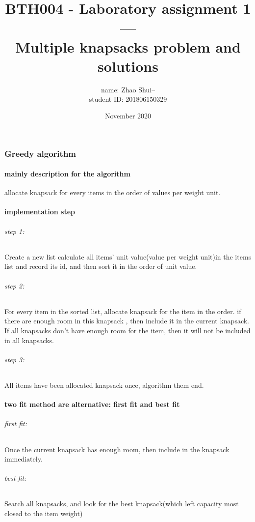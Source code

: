 \documentclass{article}
\title{BTH004 - Laboratory assignment 1---\\
Multiple knapsacks problem and solutions}
\author{name: Zhao Shui--\\student ID: 201806150329}
\date{November 2020}
\begin{document}
\maketitle

\part{}
\section{Greedy algorithm}
\subsection{mainly description for the algorithm}
allocate knapsack for every items in the order of values per weight unit.
\subsection{implementation step}
\paragraph{step 1:} Create a new list calculate all items’ unit value(value per weight unit)in the items list and record its id, and then sort it in the order of unit value.
\paragraph{step 2:} For every item in the sorted list, allocate knapsack for the item in the order. if there are enough room in this knapsack , then include it in the current knapsack. If all knapsacks don’t have enough room for the item, then it will not be included in all knapsacks.
\paragraph{step 3:} All items have been allocated knapsack once, algorithm them end.
\subsection{two fit method are alternative: first fit and best fit}
\paragraph{first fit:}Once the current knapsack has enough room, then include in the knapsack immediately.
\paragraph{best fit:}Search all knapsacks, and look for the best knapsack(which left capacity most closed to the item weight)
\end{document}
